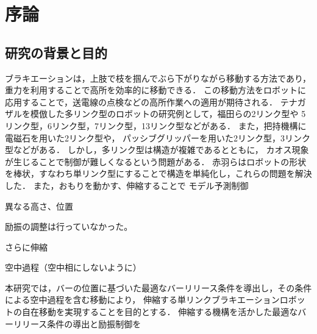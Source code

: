 \chapter[序論]%
        {序論}
        \section{研究の背景と目的}

          ブラキエーションは，上肢で枝を掴んでぶら下がりながら移動する方法であり，重力を利用することで高所を効率的に移動できる．
          この移動方法をロボットに応用することで\cite{福田敏男1990ブラキエーション形移動ロボットの研究}，送電線の点検などの高所作業への適用が期待される．
          テナガザルを模倣した多リンク型のロボットの研究例として，福田らの2リンク型\cite{福田敏男1991ブラキエーション形移動ロボットの研究2}\cite{福田敏男1992ブラキエーション形移動ロボットの研究}\cite{齋藤史倫1993ブラキエーション形移動ロボットの研究}\cite{齋藤史倫1995学習とロボット}\cite{福田敏男1996強化学習法を用いたファジィコントローラの生成}\cite{中西淳1998解析的手法による}\cite{中西淳19992}\cite{中西淳2001ハイブリッドコントローラによる}や
          5リンク型\cite{福田敏男1991ブラキエーション形移動ロボットの研究}，6リンク型\cite{福田敏男1990ブラキエーション形移動ロボットの研究}，7リンク型\cite{齋藤史倫1994ブラキエーション形移動ロボットの研究}，13リンク型\cite{長谷川泰久2001ブラキエーション形移動ロボットの研究}などがある．
          また，把持機構に電磁石を用いた2リンク型\cite{山川雄司2016ブラキエーションロボットの開発と運動生成}\cite{山川雄司2016-2ブラキエーションロボットの開発と運動生成}や，
          パッシブグリッパーを用いた2リンク型\cite{javadi2023acromonk}，3リンク型\cite{grama2024ricmonk}などがある．
          しかし，多リンク型は構造が複雑であるとともに，
          カオス現象\cite{鈴木三男2000二重振り子におけるカオス的振舞}が生じることで制御が難しくなるという問題がある．
          赤羽らはロボットの形状を棒状，すなわち単リンク型にすることで構造を単純化し，これらの問題を解決した\cite{akahane2022single}．
          また，おもりを動かす\cite{lieskovsky2023optimal}、伸縮することで\cite{Hijiri:Robomech2024}
          モデル予測制御\cite{Hijiri:Robomech2024-1}

          異なる高さ、位置

          励振の調整は行っていなかった。

          さらに伸縮

          空中過程（空中相にしないように）

          本研究では，バーの位置に基づいた最適なバーリリース条件を導出し，その条件による空中過程を含む移動により，
          伸縮する単リンクブラキエーションロボットの自在移動を実現することを目的とする．
          伸縮する機構を活かした最適なバーリリース条件の導出と励振制御を




